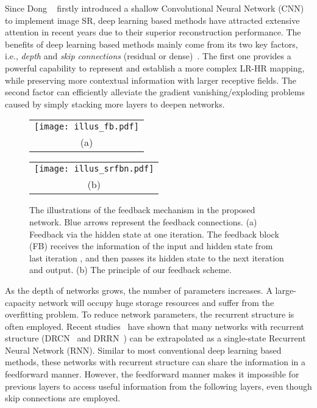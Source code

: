 \documentclass[10pt,twocolumn,letterpaper]{article}
\begin{document}
	Since Dong \etal~\cite{dong2014learning} firstly introduced a shallow Convolutional Neural Network (CNN) to implement image SR, deep learning based methods have attracted extensive attention in recent years due to their superior reconstruction performance. The benefits of deep learning based methods mainly come from its two key factors, i.e., \textit{depth} and \textit{skip connections} (residual or dense)~\cite{Kim_2016_CVPR, Tong_2017_ICCV, Tai_2017_CVPR, Haris_2018_CVPR, Zhang_2018_CVPR, zhang2018rcan, wang2018esrgan}. The first one provides a powerful capability to represent and establish a more complex LR-HR mapping, while preserving more contextual information with larger receptive fields. The second factor can efficiently alleviate the gradient vanishing/exploding problems caused by simply stacking more layers to deepen networks.
	
	\begin{figure}[t]
		\begin{center}
			\begin{tabular}{@{}c@{}}
				\texttt{[image: illus\_fb.pdf]}\\


				\small (a)
			\end{tabular}
			\begin{tabular}{@{}c@{}}
				\texttt{[image: illus\_srfbn.pdf]}\\


				\small (b)
			\end{tabular}


		\end{center}
		\caption{The illustrations of the feedback mechanism in the proposed network. Blue arrows represent the feedback connections. (a) Feedback via the hidden state at one iteration. The feedback block (FB) receives the information of the input  and hidden state from last iteration , and then passes its hidden state  to the next iteration and output. (b) The principle of our feedback scheme.}
		\label{fig:illus_fb}	
		\vspace{-0.45cm}
	\end{figure}
	
	As the depth of networks grows, the number of parameters increases. A large-capacity network will occupy huge storage resources and suffer from the overfitting problem. To reduce network parameters, the recurrent structure is often employed. Recent studies~\cite{liao2016bridging, Han_2018_CVPR} have shown that many networks with recurrent structure (\eg DRCN~\cite{Kim_2016_CVPR_DRCN} and DRRN~\cite{Tai_2017_CVPR}) can be extrapolated as a single-state Recurrent Neural Network (RNN). Similar to most conventional deep learning based methods, these networks with recurrent structure can share the information in a feedforward manner. However, the feedforward manner makes it impossible for previous layers to access useful information from the following layers, even though skip connections are employed.
	
\end{document}
